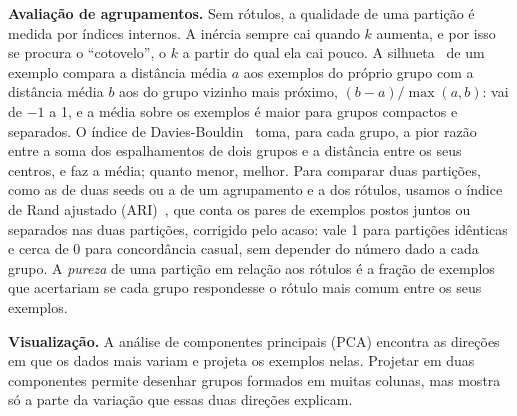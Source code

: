 \textbf{Avaliação de agrupamentos.} Sem rótulos, a qualidade de uma partição é medida por índices internos. A inércia sempre cai quando $k$ aumenta, e por isso se procura o ``cotovelo'', o $k$ a partir do qual ela cai pouco. A silhueta~\cite{rousseeuw:87} de um exemplo compara a distância média $a$ aos exemplos do próprio grupo com a distância média $b$ aos do grupo vizinho mais próximo, $(b - a)/\max(a, b)$: vai de $-1$ a 1, e a média sobre os exemplos é maior para grupos compactos e separados. O índice de Davies-Bouldin~\cite{davies:79} toma, para cada grupo, a pior razão entre a soma dos espalhamentos de dois grupos e a distância entre os seus centros, e faz a média; quanto menor, melhor. Para comparar duas partições, como as de duas seeds ou a de um agrupamento e a dos rótulos, usamos o índice de Rand ajustado (ARI)~\cite{hubert:85}, que conta os pares de exemplos postos juntos ou separados nas duas partições, corrigido pelo acaso: vale 1 para partições idênticas e cerca de 0 para concordância casual, sem depender do número dado a cada grupo. A \emph{pureza} de uma partição em relação aos rótulos é a fração de exemplos que acertariam se cada grupo respondesse o rótulo mais comum entre os seus exemplos.

\textbf{Visualização.} A análise de componentes principais (PCA) encontra as direções em que os dados mais variam e projeta os exemplos nelas. Projetar em duas componentes permite desenhar grupos formados em muitas colunas, mas mostra só a parte da variação que essas duas direções explicam.
